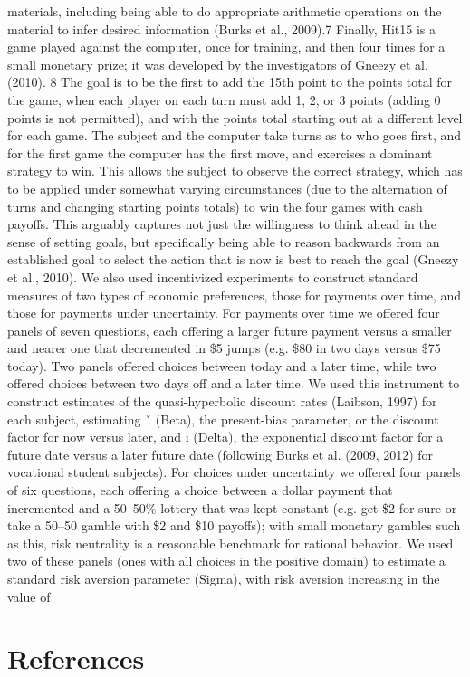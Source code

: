 \documentclass[12pt,a4paper]{article}
\begin{document}
materials, including being able to do appropriate arithmetic operations on the material to infer desired information (Burks
et al., 2009).7
Finally, Hit15 is a game played against the computer, once for training, and then four times for a small monetary prize; it
was developed by the investigators of Gneezy et al. (2010).
8 The goal is to be the first to add the 15th point to the points total
for the game, when each player on each turn must add 1, 2, or 3 points (adding 0 points is not permitted), and with the points
total starting out at a different level for each game. The subject and the computer take turns as to who goes first, and for
the first game the computer has the first move, and exercises a dominant strategy to win. This allows the subject to observe
the correct strategy, which has to be applied under somewhat varying circumstances (due to the alternation of turns and
changing starting points totals) to win the four games with cash payoffs. This arguably captures not just the willingness to
think ahead in the sense of setting goals, but specifically being able to reason backwards from an established goal to select
the action that is now is best to reach the goal (Gneezy et al., 2010).
We also used incentivized experiments to construct standard measures of two types of economic preferences, those for payments over time, and those for payments under uncertainty. For payments over time we offered four panels of seven questions, each offering a larger future payment versus a smaller and nearer one that decremented in \$5 jumps (e.g. \$80 in two days versus \$75 today). Two panels offered choices between today and a later time, while two offered choices between two days off and a later time. We used this instrument to construct estimates of the quasi-hyperbolic discount rates (Laibson, 1997) for each subject, estimating ˇ (Beta), the present-bias parameter, or the discount factor for now versus later, and ı (Delta), the exponential discount factor for a future date versus a later future date (following Burks et al. (2009, 2012) for vocational student subjects). For choices under uncertainty we offered four panels of six questions, each offering a choice between a dollar payment that incremented and a 50–50\% lottery that was kept constant (e.g. get \$2 for sure or take a 50–50 gamble with \$2 and \$10 payoffs); with small monetary gambles such as this,
risk neutrality is a reasonable benchmark for rational behavior. We used two of these panels (ones with all choices in the positive domain) to estimate a standard risk aversion parameter  (Sigma), with risk aversion increasing in the value
of 

\section{References}


\end{document}
